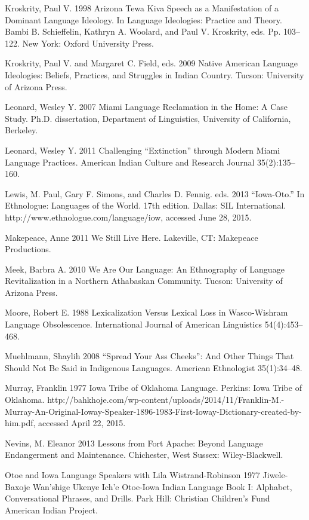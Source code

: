 \documentclass[output=paper]{LSP/langsci}
\begin{document}
\begin{reflist}
Kroskrity, Paul V. 1998 Arizona Tewa Kiva Speech as a Manifestation of a Dominant Language Ideology. In Language Ideologies: Practice and Theory. Bambi B. Schieffelin, Kathryn A. Woolard, and Paul V. Kroskrity, eds. Pp. 103--122. New York: Oxford University Press.

Kroskrity, Paul V. and Margaret C. Field, eds. 2009 Native American Language Ideologies: Beliefs, Practices, and Struggles in Indian Country. Tucson: University of Arizona Press.

Leonard, Wesley Y. 2007 Miami Language Reclamation in the Home: A Case Study. Ph.D. dissertation, Department of Linguistics, University of California, Berkeley.

Leonard, Wesley Y. 2011 Challenging ``Extinction'' through Modern Miami Language Practices. American Indian Culture and Research Journal 35(2):135--160.

Lewis, M. Paul, Gary F. Simons, and Charles D. Fennig. eds. 2013 ``Iowa-Oto.'' In Ethnologue: Languages of the World. 17th edition. Dallas: SIL International. http://www.ethnologue.com/language/iow, accessed June 28, 2015.

Makepeace, Anne 2011 We Still Live Here. Lakeville, CT: Makepeace Productions.

Meek, Barbra A. 2010 We Are Our Language: An Ethnography of Language Revitalization in a Northern Athabaskan Community. Tucson: University of Arizona Press.

Moore, Robert E. 1988 Lexicalization Versus Lexical Loss in Wasco-Wishram Language Obsolescence. International Journal of American Linguistics 54(4):453--468.

Muehlmann, Shaylih 2008 ``Spread Your Ass Cheeks'': And Other Things That Should Not Be Said in Indigenous Languages. American Ethnologist 35(1):34--48.

Murray, Franklin 1977 Iowa Tribe of Oklahoma Language. Perkins: Iowa Tribe of Oklahoma. http://bahkhoje.com/wp-content/uploads/2014/11/Franklin-M.-Murray-An-Original-Ioway-Speaker-1896-1983-First-Ioway-Dictionary-created-by-him.pdf, accessed April 22, 2015.

Nevins, M. Eleanor 2013 Lessons from Fort Apache: Beyond Language Endangerment and Maintenance. Chichester, West Sussex: Wiley-Blackwell.

Otoe and Iowa Language Speakers with Lila Wistrand-Robinson 1977 Jiwele-Baxoje Wan'shige Ukenye Ich'e Otoe-Iowa Indian Language Book I: Alphabet, Conversational Phrases, and Drills. Park Hill: Christian Children's Fund American Indian Project.


\end{reflist}
\end{document}
